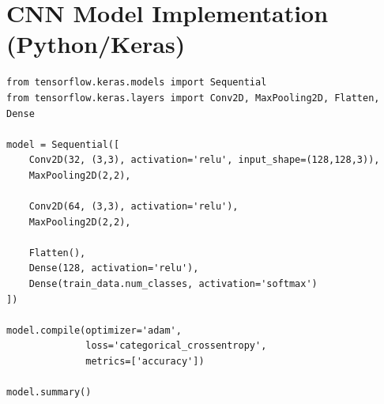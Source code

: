 \documentclass[12pt]{report}
\begin{document}
\section{CNN Model Implementation (Python/Keras)}
\begin{verbatim}
from tensorflow.keras.models import Sequential
from tensorflow.keras.layers import Conv2D, MaxPooling2D, Flatten, Dense

model = Sequential([
    Conv2D(32, (3,3), activation='relu', input_shape=(128,128,3)),
    MaxPooling2D(2,2),

    Conv2D(64, (3,3), activation='relu'),
    MaxPooling2D(2,2),

    Flatten(),
    Dense(128, activation='relu'),
    Dense(train_data.num_classes, activation='softmax')
])

model.compile(optimizer='adam',
              loss='categorical_crossentropy',
              metrics=['accuracy'])

model.summary()
\end{verbatim}

\nocite{*}
\printbibliography[title={REFERENCES}]
\end{document}
